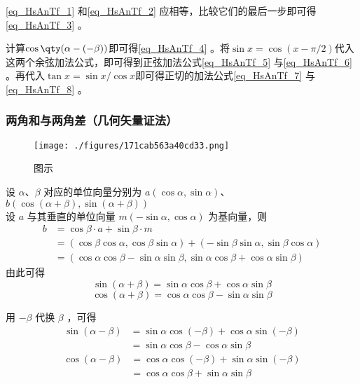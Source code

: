 \autoref{eq_HsAnTf_1} 和\autoref{eq_HsAnTf_2} 应相等，比较它们的最后一步即可得\autoref{eq_HsAnTf_3} 。

计算$\cos\qty(\alpha-(-\beta))$即可得\autoref{eq_HsAnTf_4} 。将$\sin x=\cos(x-\pi/2)$代入这两个余弦加法公式，即可得到正弦加法公式\autoref{eq_HsAnTf_5} 与\autoref{eq_HsAnTf_6} 。再代入$\tan x=\sin x/\cos x$即可得正切的加法公式\autoref{eq_HsAnTf_7} 与\autoref{eq_HsAnTf_8} 。



\subsubsection{两角和与两角差（几何矢量证法）}
\begin{figure}[ht]
\centering
\texttt{[image: ./figures/171cab563a40cd33.png]}
\caption{图示} \label{fig_HsAnTf_1}
\end{figure}
设 $\alpha$、$\beta$ 对应的单位向量分别为 $a(\cos\alpha,\sin\alpha)$、$b(\cos(\alpha+\beta),\sin(\alpha+\beta))$\\
设 $a$ 与其垂直的单位向量 $m(-\sin\alpha,\cos\alpha)$ 为基向量，则
\begin{equation}
\begin{aligned}
b &= \cos\beta \cdot a + \sin\beta \cdot m \\
&= (\cos\beta \cos\alpha,\cos\beta \sin\alpha) + (-\sin\beta \sin\alpha,\sin\beta \cos\alpha) \\
&= (\cos\alpha \cos\beta-\sin\alpha \sin\beta,\sin\alpha \cos\beta + \cos\alpha \sin\beta)
\end{aligned}
\end{equation}
由此可得
\begin{equation}
\sin(\alpha+\beta) = \sin\alpha \cos\beta + \cos\alpha \sin\beta
\end{equation}
\begin{equation}
\cos(\alpha+\beta) = \cos\alpha \cos\beta - \sin\alpha \sin\beta
\end{equation}

用 $-\beta$ 代换 $\beta$ ，可得
\begin{equation}
\begin{aligned}
\sin(\alpha-\beta) &= \sin\alpha \cos(-\beta) + \cos\alpha \sin(-\beta)\\
&=\sin\alpha \cos\beta - \cos\alpha \sin\beta
\end{aligned}
\end{equation}
\begin{equation}
\begin{aligned}
\cos(\alpha-\beta) &= \cos\alpha \cos(-\beta) + \sin\alpha \sin(-\beta)\\
&=\cos\alpha \cos\beta + \sin\alpha \sin\beta
\end{aligned}
\end{equation}

